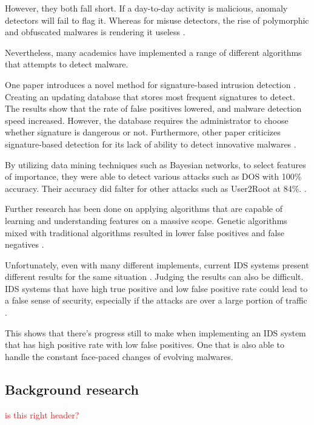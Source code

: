 \documentclass[11pt]{article}
\begin{document}
However, they both fall short. If a day-to-day activity is malicious, anomaly detectors will fail to flag it. Whereas for misuse detectors, the rise of polymorphic and obfuscated malwares is rendering it useless \cite{related-work-main-approaches}.

Nevertheless, many academics have implemented a range of different algorithms that attempts to detect malware. 

One paper introduces a novel method for signature-based intrusion detection \cite{related-work-signature-based}. Creating an updating database that stores most frequent signatures to detect. The results show that the rate of false positives lowered, and malware detection speed increased. However, the database requires the administrator to choose whether signature is dangerous or not. Furthermore, other paper criticizes signature-based detection for its lack of ability to detect innovative malwares \cite{related-work-criticise-signature}. 
 
By utilizing data mining techniques such as Bayesian networks, to select features of importance, they were able to detect various attacks such as DOS with 100\% accuracy. Their accuracy did falter for other attacks such as User2Root at 84\%. \cite{related-work-main-approaches}.

Further research has been done on applying algorithms that are capable of learning and understanding features on a massive scope. Genetic algorithms mixed with traditional algorithms resulted in lower false positives and false negatives \cite{related-work-criticise-signature}. 

Unfortunately, even with many different implements, current IDS systems present different results for the same situation \cite{related-work-advantages-and-disadvantages}. Judging the results can also be difficult. IDS systems that have high true positive and low false positive rate could lead to a false sense of security, especially if the attacks are over a large portion of traffic \cite{related-work-advantages-and-disadvantages}.

This shows that there’s progress still to make when implementing an IDS system that has high positive rate with low false positives. One that is also able to handle the constant face-paced changes of evolving malwares.

\subsection{Background research}
\textcolor{red}{is this right header?}
\end{document}
